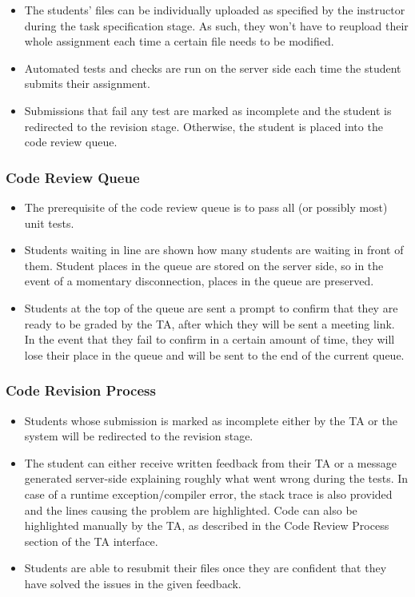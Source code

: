 \documentclass[a4paper, 12pt]{article}
\begin{document}
    \begin{itemize}
      \item The students' files can be individually uploaded as specified by the instructor during the task specification stage.
      As such, they won't have to reupload their whole assignment each time a certain file needs to be modified.
      \item Automated tests and checks are run on the server side each time the student submits their assignment.
      \item Submissions that fail any test are marked as incomplete and the student is redirected to the revision stage.
      Otherwise, the student is placed into the code review queue.
    \end{itemize}

    \subsubsection{Code Review Queue}

    \begin{itemize}
      \item The prerequisite of the code review queue is to pass all (or possibly most) unit tests.
      \item Students waiting in line are shown how many students are waiting in front of them. Student places in the queue are
      stored on the server side, so in the event of a momentary disconnection, places in the queue are preserved.
      \item Students at the top of the queue are sent a prompt to confirm that they are ready to be graded by the TA, after which they will be sent a meeting link. 
      In the event that they fail to confirm in a certain amount of time, they will lose their place in the queue and will be sent to the end of the current queue.
    \end{itemize}

    \subsubsection{Code Revision Process}

    \begin{itemize}
      \item Students whose submission is marked as incomplete either by the TA or the system will be redirected to the revision stage.
      \item The student can either receive written feedback from their TA or a message generated server-side explaining roughly
      what went wrong during the tests. In case of a runtime exception/compiler error, the stack trace is also provided and the lines causing the
      problem are highlighted. Code can also be highlighted manually by the TA, as described in the Code Review Process section of the TA interface.
      \item Students are able to resubmit their files once they are confident that they have solved the issues in the given feedback.
    \end{itemize}
\end{document}
